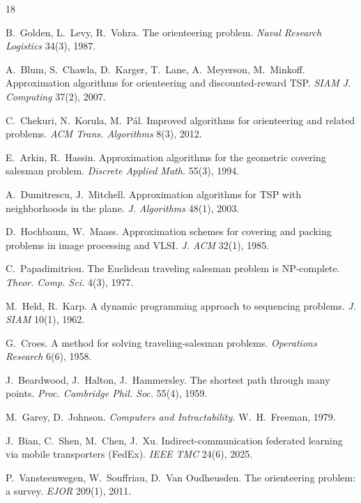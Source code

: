 \begin{thebibliography}{18}

B.~Golden, L.~Levy, R.~Vohra.
The orienteering problem.
\emph{Naval Research Logistics} 34(3), 1987.

A.~Blum, S.~Chawla, D.~Karger, T.~Lane, A.~Meyerson, M.~Minkoff.
Approximation algorithms for orienteering and discounted-reward TSP.
\emph{SIAM J. Computing} 37(2), 2007.

C.~Chekuri, N.~Korula, M.~P\'al.
Improved algorithms for orienteering and related problems.
\emph{ACM Trans. Algorithms} 8(3), 2012.

E.~Arkin, R.~Hassin.
Approximation algorithms for the geometric covering salesman problem.
\emph{Discrete Applied Math.} 55(3), 1994.

A.~Dumitrescu, J.~Mitchell.
Approximation algorithms for TSP with neighborhoods in the plane.
\emph{J. Algorithms} 48(1), 2003.

D.~Hochbaum, W.~Maass.
Approximation schemes for covering and packing problems in image processing
and VLSI.
\emph{J. ACM} 32(1), 1985.

C.~Papadimitriou.
The Euclidean traveling salesman problem is NP-complete.
\emph{Theor. Comp. Sci.} 4(3), 1977.

M.~Held, R.~Karp.
A dynamic programming approach to sequencing problems.
\emph{J. SIAM} 10(1), 1962.

G.~Croes.
A method for solving traveling-salesman problems.
\emph{Operations Research} 6(6), 1958.

J.~Beardwood, J.~Halton, J.~Hammersley.
The shortest path through many points.
\emph{Proc. Cambridge Phil. Soc.} 55(4), 1959.

M.~Garey, D.~Johnson.
\emph{Computers and Intractability.}
W.~H.~Freeman, 1979.

J.~Bian, C.~Shen, M.~Chen, J.~Xu.
Indirect-communication federated learning via mobile transporters (FedEx).
\emph{IEEE TMC} 24(6), 2025.

P.~Vansteenwegen, W.~Souffriau, D.~Van Oudheusden.
The orienteering problem: a survey.
\emph{EJOR} 209(1), 2011.


\end{thebibliography}
